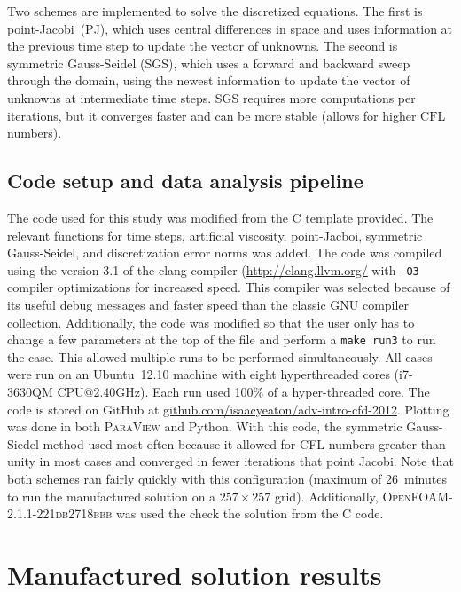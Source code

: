 \documentclass[10pt, letterpaper]{article}
\newcommand{\mesh}[1]{${#1} \times {#1}$}
\begin{document}
Two schemes are implemented to solve the discretized equations.  The first is
point-Jacobi~(PJ), which uses central differences in space and uses information
at the previous time step to update the vector of unknowns.  The second is
symmetric Gauss-Seidel (SGS), which uses a forward and backward sweep through
the domain, using the newest information to update the vector of unknowns at
intermediate time steps.  SGS requires more computations per iterations, but
it converges faster and can be more stable (allows for higher $\mathrm{CFL}$
numbers).


\subsection{Code setup and data analysis pipeline}

The code used for this study was modified from the C template provided.
The relevant functions for time steps, artificial viscosity, point-Jacboi,
symmetric Gauss-Seidel, and discretization error norms was added.  The
code was compiled using the version 3.1 of the clang compiler
(\url{http://clang.llvm.org/} with \texttt{-O3} compiler optimizations for
increased speed.  This compiler was selected because of its useful debug messages
and faster speed than the classic GNU compiler collection.  Additionally, the 
code was modified so that the user only
has to change a few parameters at the top of the file and perform a 
\texttt{make run3} to run the case.  This allowed multiple runs to be performed
simultaneously.  All cases were run on an Ubuntu~12.10 machine with eight
hyperthreaded cores (i7-3630QM CPU@2.40GHz).  Each run used 100\% of a
hyper-threaded core.  The code is stored on
GitHub at \url{github.com/isaacyeaton/adv-intro-cfd-2012}.  Plotting was done 
in both \textsc{ParaView} and Python.  With this code, the symmetric Gauss-Siedel 
method used  most often because it allowed for CFL numbers greater than unity 
in most cases
and converged in fewer iterations that point Jacobi.  Note that both schemes
ran fairly quickly with this configuration (maximum of 26~minutes to run
the manufactured solution on a \mesh{257} grid).  Additionally,
\textsc{OpenFOAM-2.1.1-221db2718bbb} was used the check the solution from
the C code.


\newpage

\section{Manufactured solution results}
\end{document}
